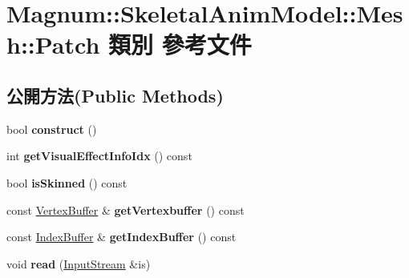 \hypertarget{class_magnum_1_1_skeletal_anim_model_1_1_mesh_1_1_patch}{}\section{Magnum\+:\+:Skeletal\+Anim\+Model\+:\+:Mesh\+:\+:Patch 類別 參考文件}
\label{class_magnum_1_1_skeletal_anim_model_1_1_mesh_1_1_patch}
\subsection*{公開方法(Public Methods)}
\begin{DoxyCompactItemize}
\item 
bool {\bfseries construct} ()\hypertarget{class_magnum_1_1_skeletal_anim_model_1_1_mesh_1_1_patch_ac1427cb8a0396d0aad3e5a1c3595edd5}{}\label{class_magnum_1_1_skeletal_anim_model_1_1_mesh_1_1_patch_ac1427cb8a0396d0aad3e5a1c3595edd5}

\item 
int {\bfseries get\+Visual\+Effect\+Info\+Idx} () const \hypertarget{class_magnum_1_1_skeletal_anim_model_1_1_mesh_1_1_patch_a9aae8c53cfc4c9f3c3a33cbe2c533b82}{}\label{class_magnum_1_1_skeletal_anim_model_1_1_mesh_1_1_patch_a9aae8c53cfc4c9f3c3a33cbe2c533b82}

\item 
bool {\bfseries is\+Skinned} () const \hypertarget{class_magnum_1_1_skeletal_anim_model_1_1_mesh_1_1_patch_a3da83608c814953e08f7457cbb65ff2f}{}\label{class_magnum_1_1_skeletal_anim_model_1_1_mesh_1_1_patch_a3da83608c814953e08f7457cbb65ff2f}

\item 
const \hyperlink{class_magnum_1_1_skeletal_anim_model_1_1_vertex_buffer}{Vertex\+Buffer} \& {\bfseries get\+Vertexbuffer} () const \hypertarget{class_magnum_1_1_skeletal_anim_model_1_1_mesh_1_1_patch_a111860a7b7e571ccaad17ff4c94f2f18}{}\label{class_magnum_1_1_skeletal_anim_model_1_1_mesh_1_1_patch_a111860a7b7e571ccaad17ff4c94f2f18}

\item 
const \hyperlink{class_magnum_1_1_skeletal_anim_model_1_1_index_buffer}{Index\+Buffer} \& {\bfseries get\+Index\+Buffer} () const \hypertarget{class_magnum_1_1_skeletal_anim_model_1_1_mesh_1_1_patch_ab639dd5d5e78e4f693e5a60221648564}{}\label{class_magnum_1_1_skeletal_anim_model_1_1_mesh_1_1_patch_ab639dd5d5e78e4f693e5a60221648564}

\item 
void {\bfseries read} (\hyperlink{class_magnum_1_1_input_stream}{Input\+Stream} \&is)\hypertarget{class_magnum_1_1_skeletal_anim_model_1_1_mesh_1_1_patch_a8bc52aa7740d82fca6f80c8fe98e5ee2}{}\label{class_magnum_1_1_skeletal_anim_model_1_1_mesh_1_1_patch_a8bc52aa7740d82fca6f80c8fe98e5ee2}


\end{DoxyCompactItemize}
